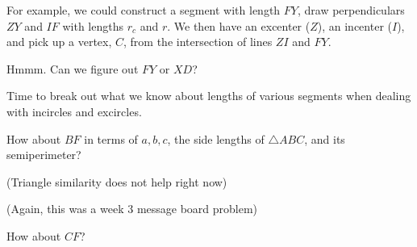 For example, we could construct a segment with length $FY$, draw perpendiculars $ZY$ and $IF$ with lengths $r_c$ and $r$. We then have an excenter ($Z$), an incenter ($I$), and pick up a vertex, $C$, from the intersection of lines $ZI$ and $FY$.

Hmmm. Can we figure out $FY$ or $XD$?

Time to break out what we know about lengths of various segments when dealing with incircles and excircles.

How about $BF$ in terms of $a,b,c$, the side lengths of $\triangle ABC$, and its semiperimeter?

(Triangle similarity does not help right now)

(Again, this was a week 3 message board problem)







How about $CF$?









